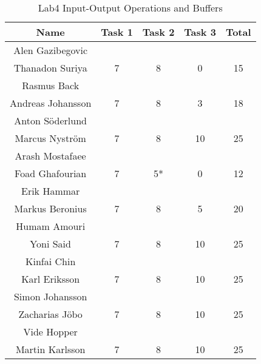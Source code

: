 \documentclass{article}
\begin{document}
\begin{table}[ht]
\caption{Lab4 Input-Output Operations and Buffers}
\centering
\begin{tabular}{c c c c c} 
\hline\hline 
Name & Task 1 & Task 2 & Task 3 & Total \\ [0.5ex] 
\hline
Alen Gazibegovic \\ Thanadon Suriya 
& 7 & 8 & 0 & 15 \\
\hline
Rasmus Back \\ Andreas Johansson 
& 7 & 8 & 3 & 18 \\
\hline 
Anton Söderlund \\ Marcus Nyström
& 7 & 8 & 10 & 25 \\
\hline
Arash Mostafaee \\ Foad Ghafourian
& 7 & 5* & 0 & 12 \\
\hline
Erik Hammar \\ Markus Beronius
& 7 & 8 & 5 & 20 \\
\hline 
Humam Amouri \\ Yoni Said
& 7 & 8 & 10 & 25 \\ 
\hline
Kinfai Chin \\ Karl Eriksson
& 7 & 8 & 10 & 25 \\ 
\hline
Simon Johansson \\ Zacharias Jöbo
& 7 & 8 & 10 & 25 \\
\hline
Vide Hopper \\ Martin Karlsson
& 7 & 8 & 10 & 25 \\ [1ex]
\hline
\end{tabular}
\label{table:nonlin}
\end{table}

\end{document}
